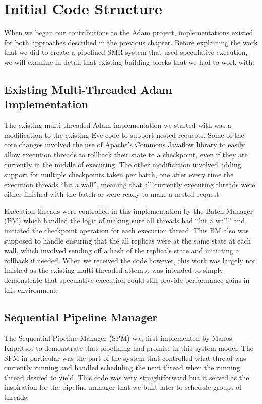 \documentclass[11pt, oneside]{report}
\begin{document}
\section{Initial Code Structure}

When we began our contributions to the Adam project, implementations existed for both approaches described in the previous chapter. 
Before explaining the work that we did to create a pipelined SMR system that used speculative execution, we will examine in detail that existing building blocks that we had to work with.

\subsection{Existing Multi-Threaded Adam Implementation}

The existing multi-threaded Adam implementation we started with was a modification to the existing Eve code to support nested requests. 
Some of the core changes involved the use of Apache's Commons Javaflow library to easily allow execution threads to rollback their state to a checkpoint, even if they are currently in the middle of executing. 
The other modification involved adding support for multiple checkpoints taken per batch, one after every time the execution threads ``hit a wall'', meaning that all currently executing threads were either finished with the batch or were ready to make a nested request.

Execution threads were controlled in this implementation by the Batch Manager (BM) which handled the logic of making sure all threads had ``hit a wall'' and initiated the checkpoint operation for each execution thread. 
This BM also was supposed to handle ensuring that the all replicas were at the same state at each wall, which involved sending off a hash of the replica's state and initiating a rollback if needed. 
When we received the code however, this work was largely not finished as the existing multi-threaded attempt was intended to simply demonstrate that speculative execution could still provide performance gains in this environment.

\subsection{Sequential Pipeline Manager}

The Sequential Pipeline Manager (SPM) was first implemented by Manos Kapritsos to demonstrate that pipelining had promise in this system model. 
The SPM in particular was the part of the system that controlled what thread was currently running and handled scheduling the next thread when the running thread desired to yield. 
This code was very straightforward but it served as the inspiration for the pipeline manager that we built later to schedule groups of threads.
\end{document}
